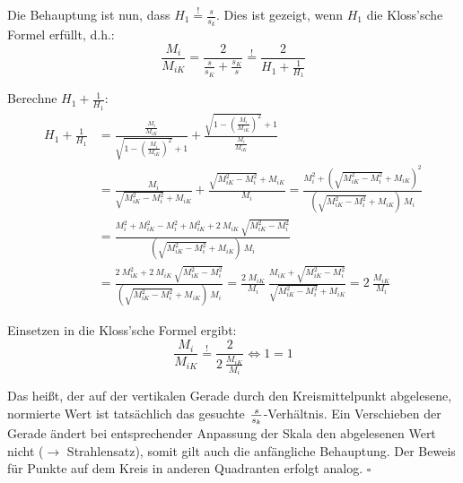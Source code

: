 \documentclass[11pt]{article}
\begin{document}
Die Behauptung ist nun, dass $H_1 \overset{!}{=} \frac{s}{s_k}$. Dies ist gezeigt, wenn $H_1$ die Kloss'sche Formel erfüllt, d.h.:
\[
	\frac{M_i}{M_{iK}} = \frac{2}{\frac{s}{s_K} + \frac{s_K}{s}} \overset{!}{=} \frac{2}{H_1 + \frac{1}{H_1}}
\]

Berechne $H_1 + \frac{1}{H_1}$:
\begin{align*}
H_1 + \frac{1}{H_1}
		&= \frac{\frac{M_i}{M_{iK}}}{\sqrt{1 - \left( \frac{M_i}{M_{iK}} \right)^2} + 1} + \frac{\sqrt{1 - \left( \frac{M_i}{M_{iK}} \right)^2} + 1}{\frac{M_i}{M_{iK}}} \\
		&= \frac{M_i}{\sqrt{M_{iK}^2 - M_i^2} + M_{iK}} + \frac{\sqrt{M_{iK}^2 - M_i^2} + M_{iK}}{M_i} = \frac{M_i^2 + \left(\sqrt{M_{iK}^2 - M_i^2} + M_{iK}\right)^2}{\left(\sqrt{M_{iK}^2 - M_i^2} + M_{iK}\right)~M_i} \\
		&= \frac{M_i^2 + M_{iK}^2 - M_i^2 + M_{iK}^2 + 2 ~ M_{iK} ~ \sqrt{M_{iK}^2 - M_i^2}}{\left(\sqrt{M_{iK}^2 - M_i^2} + M_{iK}\right)~M_i} \\
		&= \frac{2 ~ M_{iK}^2 + 2 ~ M_{iK} ~ \sqrt{M_{iK}^2 - M_i^2}}{\left(\sqrt{M_{iK}^2 - M_i^2} + M_{iK}\right)~M_i} = \frac{2 \; M_{iK}}{M_i} ~ \frac{M_{iK} + \sqrt{M_{iK}^2 - M_i^2}}{\sqrt{M_{iK}^2 - M_i^2} + M_{iK}} = 2 ~ \frac{M_{iK}}{M_i}
\end{align*}

Einsetzen in die Kloss'sche Formel ergibt:
\[
	\frac{M_i}{M_{iK}} \overset{!}{=} \frac{2}{2 ~ \frac{M_{iK}}{M_i}} \Leftrightarrow 1 = 1
\]

Das heißt, der auf der vertikalen Gerade durch den Kreismittelpunkt abgelesene, normierte Wert ist tatsächlich das gesuchte $s \over s_k$-Verhältnis. Ein Verschieben der Gerade ändert bei entsprechender Anpassung der Skala den abgelesenen Wert nicht ($\rightarrow$ Strahlensatz), somit gilt auch die anfängliche Behauptung. Der Beweis für Punkte auf dem Kreis in anderen Quadranten erfolgt analog. $\square$
\end{document}
